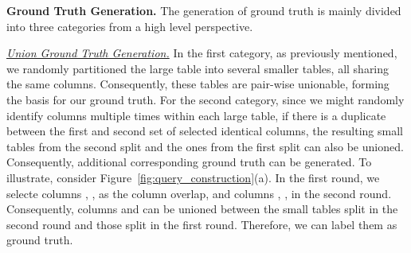   
  

\noindent \textbf{Ground Truth Generation.} 
The generation of ground truth is mainly divided into three categories from a high level perspective.


\noindent \underline{\textit{Union Ground Truth Generation.}}  
In the first category, as previously mentioned, we randomly partitioned the large table into several smaller tables, all sharing the same columns. Consequently, these tables are pair-wise unionable, forming the basis for our ground truth. For the second category, since we might randomly identify columns multiple times within each large table, if there is a duplicate between the first and second set of selected identical columns, the resulting small tables from the second split and the ones from the first split can also be unioned. Consequently, additional corresponding ground truth can be generated.
To illustrate, consider Figure~\ref{fig:query_construction}(a). In the first round, we selecte columns , ,  as the column overlap, and columns , ,  in the second round. Consequently, columns  and  can be unioned between the small tables split in the second round and those split in the first round. Therefore, we can label them as ground truth.

